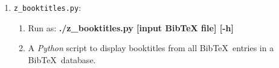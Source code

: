 \begin{enumerate}
\begin{enumerate}
	\item Run as: {\bf ./validate\_url.py [input BibTeX file] [output BibTeX file] [-h]}
	\item {\it [output BibTeX file]} is an optional parameter.
	\item A {\it Python} script to check each BibTeX entry in a BibTeX database if it has the non-standard {\sc Bib}\TeX\ field(s) ``Bdsk-Url-1'' (and ``Bdsk-Url-2''), and if the ``Url'' (and ``Doi'') field(s) is(/are) missing; if these conditions are true, copy their values to the ``Url'' BibTeX field (and ``Doi'' field, if it is a DOI).
	\end{enumerate}
\item {\tt z\_booktitles.py}: \vspace{-0.3cm}
	\begin{enumerate} \itemsep -2pt
	\item Run as: {\bf ./z\_booktitles.py [input BibTeX file] [-h]}
	\item A {\it Python} script to display booktitles from all {\sc Bib}\TeX\ entries in a {\sc Bib}\TeX\ database.
	\end{enumerate}
\end{enumerate}

























